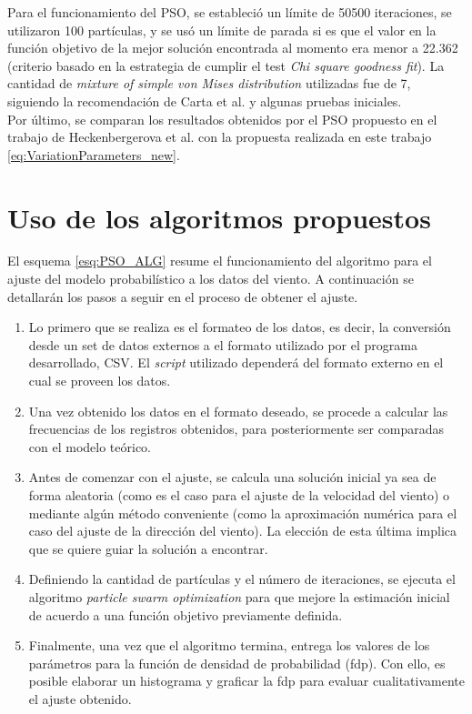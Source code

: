 Para el funcionamiento del PSO, se estableció un límite de 50500 iteraciones, se utilizaron 100 partículas, y se usó un límite de parada si es que el valor en la función objetivo de la mejor solución encontrada al momento era menor a 22.362 (criterio basado en la estrategia de cumplir el test \emph{Chi square goodness fit}). La cantidad de \emph{mixture of simple von Mises distribution} utilizadas fue de 7, siguiendo la recomendación de Carta et al. \cite{Carta07} y algunas pruebas iniciales.\\

Por último, se comparan los resultados obtenidos por el PSO propuesto en el trabajo de Heckenbergerova et al. \cite{Heckenbergerova15} con la propuesta realizada en este trabajo 
\ref{eq:VariationParameters_new}.

\section{Uso de los algoritmos propuestos}
El esquema \ref{esq:PSO_ALG} resume el funcionamiento del algoritmo para el ajuste del modelo probabilístico a los datos del viento. A continuación se detallarán los pasos a seguir en el proceso de obtener el ajuste.
\begin{enumerate}
    \item Lo primero que se realiza es el formateo de los datos, es decir, la conversión desde un set de datos externos a el formato utilizado por el programa desarrollado, CSV. El \emph{script} utilizado dependerá del formato externo en el cual se proveen los datos.
    \item Una vez obtenido los datos en el formato deseado, se procede a calcular las frecuencias de los registros obtenidos, para posteriormente ser comparadas con el modelo teórico.
    \item Antes de comenzar con el ajuste, se calcula una solución inicial ya sea de forma aleatoria (como es el caso para el ajuste de la velocidad del viento) o mediante algún método conveniente (como la aproximación numérica para el caso del ajuste de la dirección del viento). La elección de esta última implica que se quiere guiar la solución a encontrar.  
    \item Definiendo la cantidad de partículas y el número de iteraciones, se ejecuta el algoritmo \emph{particle swarm optimization} para que mejore la estimación inicial de acuerdo a una función objetivo previamente definida. 
    \item Finalmente, una vez que el algoritmo termina, entrega los valores de los parámetros para la función de densidad de probabilidad (fdp). Con ello, es posible elaborar un histograma y graficar la fdp para evaluar cualitativamente el ajuste obtenido.
\end{enumerate}
